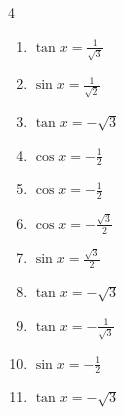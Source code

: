 \begin{multicols}{4}
\begin{enumerate}
  \item $\displaystyle \tan{x}  = \frac{1}{\sqrt{3}}$


  \item $\displaystyle \sin{x}  = \frac{1}{\sqrt{2}}$


  \item $\displaystyle \tan{x}  = -\sqrt{3}$


  \item $\displaystyle \cos{x}  = -\frac{1}{2}$


  \item $\displaystyle \cos{x}  = -\frac{1}{2}$


  \item $\displaystyle \cos{x}  = -\frac{\sqrt{3}}{2}$


  \item $\displaystyle \sin{x}  = \frac{\sqrt{3}}{2}$


  \item $\displaystyle \tan{x}  = -\sqrt{3}$


  \item $\displaystyle \tan{x}  = -\frac{1}{\sqrt{3}}$


\columnbreak %

\resetques

  \item $\displaystyle \sin{x}  = -\frac{1}{2}$


  \item $\displaystyle \tan{x}  = -\sqrt{3}$


\end{enumerate}
\end{multicols}
